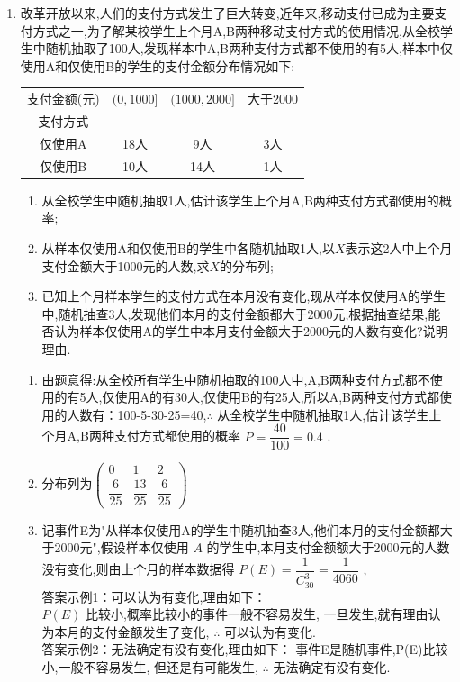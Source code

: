 \begin{enumerate}
\item 改革开放以来,人们的支付方式发生了巨大转变,近年来,移动支付已成为主要支付方式之一,为了解某校学生上个月A,B两种移动支付方式的使用情况,从全校学生中随机抽取了100人,发现样本中A,B两种支付方式都不使用的有5人,样本中仅使用A和仅使用B的学生的支付金额分布情况如下:
\begin{center}
\begin{tabular}{|c|c|c|c|}
\hline
支付金额(元) & $(0, 1000]$ & $(1000, 2000]$ & 大于2000 \\
支付方式 & & & \\
\hline
仅使用A & 18人 & 9人 & 3人 \\
\hline
仅使用B & 10人 & 14人 & 1人 \\
\hline
\end{tabular}
\end{center}
\begin{enumerate}
\item 从全校学生中随机抽取1人,估计该学生上个月A,B两种支付方式都使用的概率;
\item 从样本仅使用A和仅使用B的学生中各随机抽取1人,以$X$表示这2人中上个月支付金额大于1000元的人数,求$X$的分布列;
\item 已知上个月样本学生的支付方式在本月没有变化,现从样本仅使用A的学生中,随机抽查3人,发现他们本月的支付金额都大于2000元,根据抽查结果,能否认为样本仅使用A的学生中本月支付金额大于2000元的人数有变化?说明理由.
\end{enumerate}

\begin{jieda}
    \begin{enumerate}
        \item 由题意得:从全校所有学生中随机抽取的100人中,A,B两种支付方式都不使用的有5人,仅使用A的有30人,仅使用B的有25人,所以A,B两种支付方式都使用的人数有：100-5-30-25=40,$\therefore$ 从全校学生中随机抽取1人,估计该学生上个月A,B两种支付方式都使用的概率 $P = \dfrac{40}{100} = {0.4}$ .
        
    \item 分布列为$\begin{pmatrix}
        0 & 1 & 2\\
        \dfrac{6}{25} & \dfrac{13}{25} & \dfrac{6}{25}
    \end{pmatrix}$
    
    \item 记事件E为"从样本仅使用A的学生中随机抽查3人,他们本月的支付金额都大于2000元",假设样本仅使用 ${A}$ 的学生中,本月支付金额额大于2000元的人数没有变化,则由上个月的样本数据得 $P\left( E\right)  = \dfrac{1}{{C}_{30}^{3}} = \dfrac{1}{4060}$ ,\\
    答案示例1：可以认为有变化,理由如下：\\
    $P\left( E\right)$ 比较小,概率比较小的事件一般不容易发生,
    一旦发生,就有理由认为本月的支付金额发生了变化,
    $\therefore$ 可以认为有变化.\\
    答案示例2：无法确定有没有变化,理由如下：
    事件E是随机事件,P(E)比较小,一般不容易发生, 但还是有可能发生,
    $\therefore$ 无法确定有没有变化.
    \end{enumerate}
\end{jieda}
\end{enumerate}



